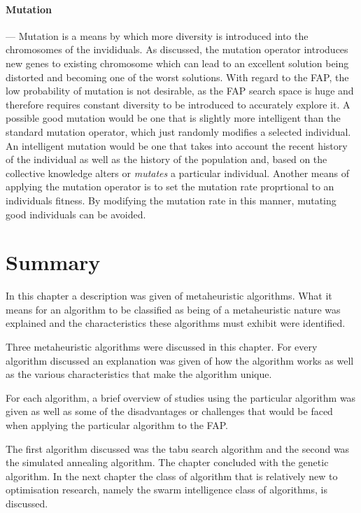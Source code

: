 \paragraph{Mutation}
--- Mutation is a means by which more diversity is introduced into the chromosomes of the invididuals.  As discussed, the mutation operator introduces new genes to existing chromosome which can lead to an excellent solution being distorted and becoming one of the worst solutions. With regard to the \gls{FAP}, the low probability of mutation is not desirable, as the \gls{FAP} search space is huge and therefore requires constant diversity to be introduced to accurately explore it. A possible good mutation would be one that is slightly more intelligent than the standard mutation operator, which just randomly modifies a selected individual. An intelligent mutation would be one that takes into account the recent history of the individual as well as the history of the population and, based on the collective knowledge alters or \emph{mutates} a particular individual. Another means of applying the mutation operator is to set the mutation rate proprtional to an individuals fitness. By modifying the mutation rate in this manner, mutating good individuals can be avoided.
\section {Summary}
In this chapter a description was given of metaheuristic algorithms. What it means for an algorithm to be classified as being of a metaheuristic nature was explained and the characteristics these algorithms must exhibit were identified.

Three metaheuristic algorithms were discussed in this chapter. For every algorithm discussed an explanation was given of how the algorithm works as well as the various characteristics that make the algorithm unique.

For each algorithm, a brief overview of studies using the particular algorithm was given as well as some of the disadvantages or challenges that would be faced when applying the particular algorithm to the \gls{FAP}.

The first algorithm discussed was the tabu search algorithm and the second was the simulated annealing algorithm. The chapter concluded with the genetic algorithm. In the next chapter the class of algorithm that is relatively new to optimisation research, namely the swarm intelligence class of algorithms, is discussed.

